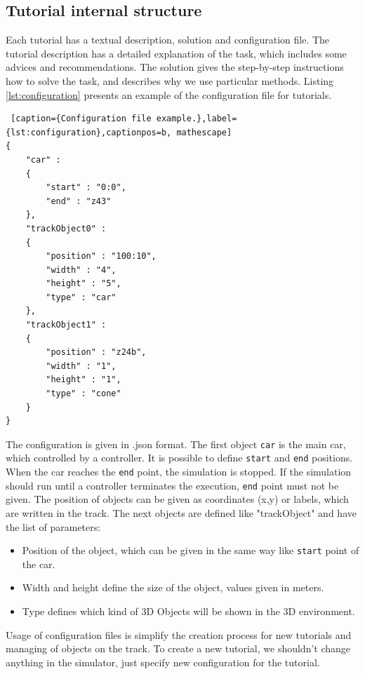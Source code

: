 \subsection{Tutorial internal structure}
Each tutorial has a textual description, solution and configuration file. The tutorial description has a detailed explanation of the task, which includes some advices and recommendations. The solution gives the step-by-step instructions how to solve the task, and describes why we use particular methods. Listing \ref{lst:configuration} presents an example of the configuration file for tutorials.
\bigskip
\begin{lstlisting} [caption={Configuration file example.},label={lst:configuration},captionpos=b, mathescape]
{
    "car" : 
    {
        "start" : "0:0",
        "end" : "z43"
    },
    "trackObject0" :
    {
        "position" : "100:10",
        "width" : "4",
        "height" : "5",
        "type" : "car"
    },
    "trackObject1" :
    {
        "position" : "z24b",
        "width" : "1",
        "height" : "1",
        "type" : "cone"
    }
}
\end{lstlisting}
\bigskip
The configuration is given in .json format. The first object \texttt{car} is the main car, which controlled by a controller. It is possible to define \texttt{start} and \texttt{end} positions. When the car reaches the \texttt{end} point, the simulation is stopped. If the simulation should run until a controller terminates the execution, \texttt{end} point must not be given. The position of objects can be given as coordinates (x,y) or labels, which are written in the track. The next objects are defined like "trackObject" and have the list of parameters:
\begin{itemize}
    \item Position of the object, which can be given in the same way like \texttt{start} point of the car.
    \item Width and height define the size of the object, values given in meters.
    \item Type defines which kind of 3D Objects will be shown in the 3D environment.
\end{itemize}
Usage of configuration files is simplify the creation process for new tutorials and managing of objects on the track. To create a new tutorial, we shouldn't change anything in the simulator, just specify new configuration for the tutorial.

